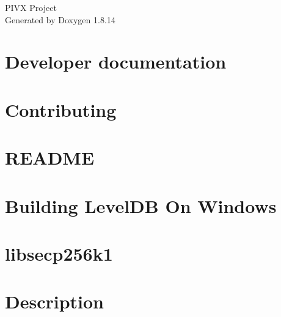 \documentclass[twoside]{book}
\newcommand{\+}{\discretionary{\mbox{\scriptsize$\hookleftarrow$}}{}{}}
\newcommand{\clearemptydoublepage}{%
  \newpage{\pagestyle{empty}\cleardoublepage}%
}
\begin{document}
\hypersetup{pageanchor=false,
             bookmarksnumbered=true,
             pdfencoding=unicode
            }
\begin{titlepage}
\vspace*{7cm}
\begin{center}%
{\Large P\+I\+VX Project }\\
\vspace*{1cm}
{\large Generated by Doxygen 1.8.14}\\
\end{center}
\end{titlepage}
\clearemptydoublepage
{}
\tableofcontents
\clearemptydoublepage
{}
\hypersetup{pageanchor=true}

\chapter{Developer documentation}
\label{index}\hypertarget{index}{}
\chapter{Contributing}
\label{md__p_i_v_x_src_leveldb__c_o_n_t_r_i_b_u_t_i_n_g}

\chapter{R\+E\+A\+D\+ME}
\label{md__p_i_v_x_src_leveldb__r_e_a_d_m_e}

\chapter{Building Level\+DB On Windows}
\label{md__p_i_v_x_src_leveldb__w_i_n_d_o_w_s}

\chapter{libsecp256k1}
\label{md__p_i_v_x_src_secp256k1__r_e_a_d_m_e}

\chapter{Description}
\label{md__p_i_v_x_src_test_data__r_e_a_d_m_e}

\end{document}
